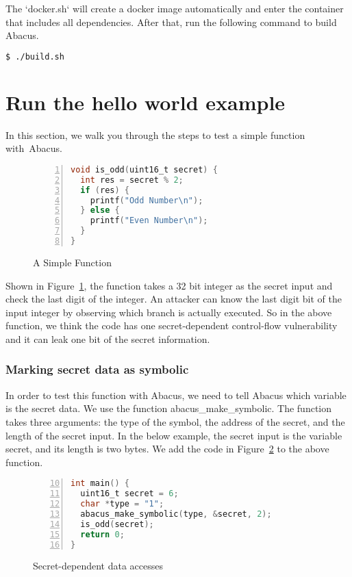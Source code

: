 \documentclass[10pt,conference]{IEEEtran}
\newcommand{\tool}{\textsf{Abacus}}
\begin{document}
The `docker.sh` will create a docker image automatically and enter the container that includes all dependencies. After that, run the following command to build Abacus.

\begin{lstlisting}[language=bash]
$ ./build.sh
\end{lstlisting}
\section{Run the hello world example}
In this section, we walk you through the steps to test a simple function with~\tool{}.

\begin{figure}[h]
\begin{lstlisting}[xleftmargin=.06\textwidth, xrightmargin=.06\textwidth,numbers=left, frame=single, language=C]
void is_odd(uint16_t secret) {
  int res = secret % 2;        
  if (res) {             
    printf("Odd Number\n");
  } else {
    printf("Even Number\n");
  }
}
\end{lstlisting}
\caption{A Simple Function}
\label{fig:example0}
\end{figure}

Shown in Figure~\ref{fig:example0}, the function takes a 32 bit integer as the secret input and check the last digit of the integer. An attacker can know the last digit bit of the input integer by observing which branch is actually executed. So in the above function, we think the code has one secret-dependent control-flow vulnerability and it can leak one bit of the secret information.

\subsubsection{Marking secret data as symbolic}
In order to test this function with Abacus, we need to tell Abacus which variable is the secret data. We use the function \textsf{abacus\_make\_symbolic}. The function takes three arguments: the type of the symbol, the address of the secret, and the length of the secret input. In the below example, the secret input is the variable secret, and its length is two bytes. We add the code in Figure~\ref{fig:example1} to the above function.

\begin{figure}[h]
\begin{lstlisting}[firstnumber=10, xleftmargin=.06\textwidth, xrightmargin=.06\textwidth,numbers=left, frame=single, language=C]
int main() {
  uint16_t secret = 6;
  char *type = "1";
  abacus_make_symbolic(type, &secret, 2); 
  is_odd(secret);
  return 0;
}
\end{lstlisting}
\caption{Secret-dependent data accesses}
\label{fig:example1}
\end{figure}
\end{document}
